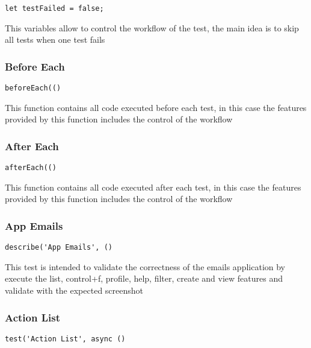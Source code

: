 \documentclass[a4paper]{article}
\begin{document}
\begin{lstlisting}
let testFailed = false;
\end{lstlisting}

This variables allow to control the workflow of the test, the main idea is to
skip all tests when one test fails

\hypertarget{toc134}{}
\subsubsection{Before Each}

\begin{lstlisting}
beforeEach(()
\end{lstlisting}

This function contains all code executed before each test, in this case the
features provided by this function includes the control of the workflow

\hypertarget{toc135}{}
\subsubsection{After Each}

\begin{lstlisting}
afterEach(()
\end{lstlisting}

This function contains all code executed after each test, in this case the
features provided by this function includes the control of the workflow

\hypertarget{toc136}{}
\subsubsection{App Emails}

\begin{lstlisting}
describe('App Emails', ()
\end{lstlisting}

This test is intended to validate the correctness of the emails application by
execute the list, control+f, profile, help, filter, create and view features and
validate with the expected screenshot

\hypertarget{toc137}{}
\subsubsection{Action List}

\begin{lstlisting}
test('Action List', async ()
\end{lstlisting}
\end{document}
